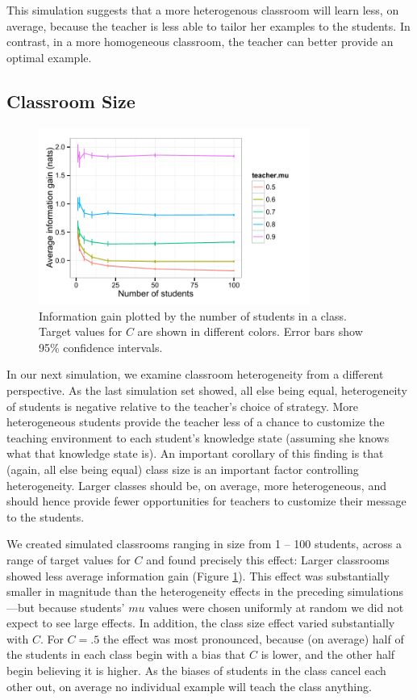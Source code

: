 \documentclass[10pt,letterpaper]{article}
\begin{document}
This simulation suggests that a more heterogenous classroom will learn less, on average, because the teacher is less able to tailor her examples to the students. In contrast, in a more homogeneous classroom, the teacher can better provide an optimal example. 

\subsection{Classroom Size}

\begin{figure}[t]
\begin{center}
\includegraphics[width=3.5in]{figures/class_size.pdf}
\end{center}
\caption{\label{fig:class} Information gain plotted by the number of students in a class. Target values for $C$ are shown in different colors. Error bars show 95\% confidence intervals.}
\end{figure}

In our next simulation, we examine classroom heterogeneity from a different perspective. As the last simulation set showed, all else being equal, heterogeneity of students is negative relative to the teacher's choice of strategy. More heterogeneous students provide the teacher less of a chance to customize the teaching environment to each student's knowledge state (assuming she knows what that knowledge state is). An important corollary of this finding is that (again, all else being equal) class size is an important factor controlling heterogeneity. Larger classes should be, on average, more heterogeneous, and should hence provide fewer opportunities for teachers to customize their message to the students. 

We created simulated classrooms ranging in size from 1 -- 100 students, across a range of target values for $C$ and found precisely this effect: Larger classrooms showed less average information gain (Figure \ref{fig:class}). This effect was substantially smaller in magnitude than the heterogeneity effects in the preceding simulations---but because students' $mu$ values were chosen uniformly at random we did not expect to see large effects. In addition, the class size effect varied substantially with $C$. For $C=.5$ the effect was most pronounced, because (on average) half of the students in each class begin with a bias that $C$ is lower, and the other half begin believing it is higher. As the biases of students in the class cancel each other out, on average no individual example will teach the class anything. 
\end{document}
